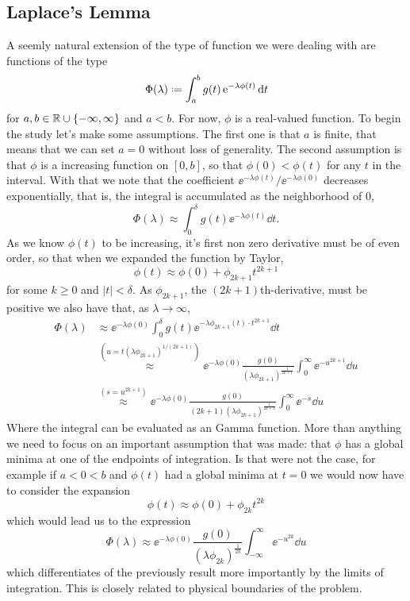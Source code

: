 \subsection{Laplace's Lemma}

A seemly natural extension of the type of function we were dealing with are functions of the type
\begin{equation}
	\Phi(\lambda) \deff \int_{a}^{b} g(t) \ee^{-\lambda \phi(t)} \dd t
	\label{equation: Laplace}
\end{equation}
for $a,b \in \mathbb{R} \cup \{-\infty, \infty\}$ and $a<b$. For now, $\phi$ is a real-valued function. To begin the study let's make some assumptions. The first one is that $a$ is finite, that means that we can set $a=0$ without loss of generality. The second assumption is that $\phi$ is a increasing function on $[0,b]$, so that $\phi(0) < \phi(t)$ for any $t$ in the interval. With that we note that the coefficient $\ee^{-\lambda \phi(t)} / \ee^{-\lambda \phi(0)}$ decreases exponentially, that is, the integral is accumulated as the neighborhood of $0$,
$$\Phi(\lambda) \approx \int_{0}^{\delta} g(t) \ee^{-\lambda \phi(t)} \dd t.$$
As we know $\phi(t)$ to be increasing, it's first non zero derivative must be of even order, so that when we expanded the function by Taylor, 
$$\phi(t) \approx \phi(0) + \phi_{2k+1} t^{2k+1}$$
for some $k\geq 0$ and $|t| < \delta$. As $\phi_{2k+1}$, the $(2k+1)$th-derivative, must be positive we also have that, as $\lambda \rightarrow \infty$,
\begin{equation*}
	\begin{split}
		\Phi(\lambda) & \approx \ee^{-\lambda \phi(0)} \int_{0}^{\delta} g(t) \ee^{-\lambda \phi_{2k+1}(t) \cdot t^{2k+1}} \dd t\\
		& \stackrel{(u=t(\lambda \phi_{2k+1})^{1/(2k+1)})}{\approx} \ee^{-\lambda \phi(0)} \frac{g(0)}{(\lambda \phi_{2k+1})^{\frac{1}{2k+1}}} \int_{0}^{\infty} \ee^{-u^{2k+1}} \dd u \\
		& \stackrel{(s=u^{2k+1})}{\approx} \ee^{-\lambda \phi(0)} \frac{g(0)}{ (2k+1)(\lambda \phi_{2k+1})^{\frac{1}{2k+1}}} \int_{0}^{\infty} \ee^{-s} \dd u
	\end{split}
\end{equation*}
Where the integral can be evaluated as an Gamma function. More than anything we need to focus on an important assumption that was made: that $\phi$ has a global minima at one of the endpoints of integration. Is that were not the case, for example if $a < 0 < b$ and $\phi(t)$ had a global minima at $t=0$ we would now have to consider the expansion
$$\phi(t) \approx \phi(0) + \phi_{2k} t^{2k}$$
which would lead us to the expression
$$\Phi(\lambda) \approx \ee^{-\lambda \phi(0)} \frac{g(0)}{(\lambda \phi_{2k})^{\frac{1}{2k}}} \int_{-\infty}^{\infty} \ee^{-u^{2k}} \dd u$$
which differentiates of the previously result more importantly by the limits of integration. This is closely related to physical boundaries of the problem.

